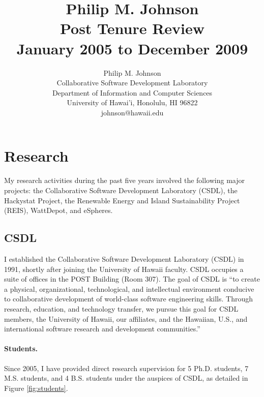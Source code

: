 \documentclass[11pt]{article}
\begin{document}
\title{{\bf Philip M. Johnson \\ 
       Post Tenure Review \\ 
       January 2005 to December 2009}}

\author{Philip M. Johnson \\
      Collaborative Software Development Laboratory \\
      Department of Information and Computer Sciences \\
      University of Hawai'i,  Honolulu, HI 96822 \\
      johnson@hawaii.edu 
}

\maketitle

\section{Research}

My research activities during the past five years involved the following major projects: the Collaborative Software Development Laboratory (CSDL), the Hackystat Project, the Renewable Energy and Island Sustainability Project (REIS), WattDepot, and eSpheres.

\subsection{CSDL}

I established the Collaborative Software Development Laboratory (CSDL) in 1991, shortly after joining the University of Hawaii faculty.  CSDL occupies a suite of offices in the POST Building (Room 307). The goal of CSDL is ``to create a physical, organizational, technological, and intellectual environment conducive to collaborative development of world-class software engineering skills. Through research, education, and technology transfer, we pursue this goal for CSDL members, the University of Hawaii, our affiliates, and the Hawaiian, U.S., and international software research and development communities.''

\paragraph{Students.} Since 2005, I have provided direct research supervision for 5 Ph.D. students, 7 M.S. students, and 4 B.S. students under the auspices of CSDL, as detailed in Figure \ref{fig:students}.
\end{document}
